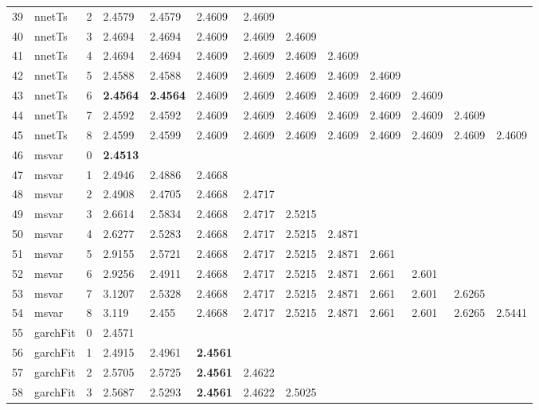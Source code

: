 \documentclass[10pt,a4paper]{article}
\begin{document}
\begin{table}[ht]
\begin{tabular}{rlrllllllllll}
  39 & nnetTs &     2 & 2.4579 & 2.4579 & 2.4609 & 2.4609 &  &  &  &  &  &  \\ 
  40 & nnetTs &     3 & 2.4694 & 2.4694 & 2.4609 & 2.4609 & 2.4609 &  &  &  &  &  \\ 
  41 & nnetTs &     4 & 2.4694 & 2.4694 & 2.4609 & 2.4609 & 2.4609 & 2.4609 &  &  &  &  \\ 
  42 & nnetTs &     5 & 2.4588 & 2.4588 & 2.4609 & 2.4609 & 2.4609 & 2.4609 & 2.4609 &  &  &  \\ 
  43 & nnetTs &     6 & \textbf{2.4564} & \textbf{2.4564} & 2.4609 & 2.4609 & 2.4609 & 2.4609 & 2.4609 & 2.4609 &  &  \\ 
  44 & nnetTs &     7 & 2.4592 & 2.4592 & 2.4609 & 2.4609 & 2.4609 & 2.4609 & 2.4609 & 2.4609 & 2.4609 &  \\ 
  45 & nnetTs &     8 & 2.4599 & 2.4599 & 2.4609 & 2.4609 & 2.4609 & 2.4609 & 2.4609 & 2.4609 & 2.4609 & 2.4609 \\ 
   \hline
46 & msvar &     0 & \textbf{2.4513} &  &  &  &  &  &  &  &  &  \\ 
  47 & msvar &     1 & 2.4946 & 2.4886 & 2.4668 &  &  &  &  &  &  &  \\ 
  48 & msvar &     2 & 2.4908 & 2.4705 & 2.4668 & 2.4717 &  &  &  &  &  &  \\ 
  49 & msvar &     3 & 2.6614 & 2.5834 & 2.4668 & 2.4717 & 2.5215 &  &  &  &  &  \\ 
  50 & msvar &     4 & 2.6277 & 2.5283 & 2.4668 & 2.4717 & 2.5215 & 2.4871 &  &  &  &  \\ 
  51 & msvar &     5 & 2.9155 & 2.5721 & 2.4668 & 2.4717 & 2.5215 & 2.4871 & 2.661 &  &  &  \\ 
  52 & msvar &     6 & 2.9256 & 2.4911 & 2.4668 & 2.4717 & 2.5215 & 2.4871 & 2.661 & 2.601 &  &  \\ 
  53 & msvar &     7 & 3.1207 & 2.5328 & 2.4668 & 2.4717 & 2.5215 & 2.4871 & 2.661 & 2.601 & 2.6265 &  \\ 
  54 & msvar &     8 & 3.119 & 2.455 & 2.4668 & 2.4717 & 2.5215 & 2.4871 & 2.661 & 2.601 & 2.6265 & 2.5441 \\ 
   \hline
55 & garchFit &     0 & 2.4571 &  &  &  &  &  &  &  &  &  \\ 
  56 & garchFit &     1 & 2.4915 & 2.4961 & \textbf{2.4561} &  &  &  &  &  &  &  \\ 
  57 & garchFit &     2 & 2.5705 & 2.5725 & \textbf{2.4561} & 2.4622 &  &  &  &  &  &  \\ 
  58 & garchFit &     3 & 2.5687 & 2.5293 & \textbf{2.4561} & 2.4622 & 2.5025 &  &  &  &  &  \\ 

\end{tabular}
\end{table}
\end{document}
